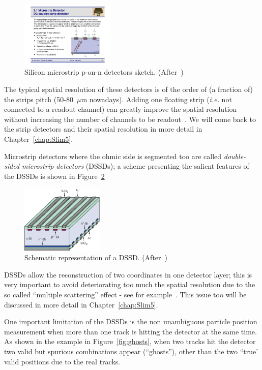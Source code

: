  \begin{figure}[htbp]
   \centering
   \includegraphics[width=0.4\textwidth]{Strips.pdf} 
      \caption{\label{fig:strips} Silicon microstrip p-on-n detectors sketch. (After~\cite{Krammer})}
\end{figure}
 
 The typical spatial resolution of these detectors is of the order of (a fraction of) the strips pitch 
 (50-80~$\mu$m nowadays).
 Adding one floating strip ({\it i.e.} not connected to a readout channel) can greatly 
 improve the spatial resolution without increasing the number of channels to be 
 readout~\cite{TURCHETTA}. We will come back to the strip detectors and their spatial resolution in 
 more detail in 
 Chapter~\ref{chap:Slim5}.
 
 Microstrip detectors where  the ohmic side is segmented too  are called {\it double-sided microstrip 
 detectors} (DSSDs); a scheme presenting the salient features of the DSSDs is shown in 
 Figure~\ref{fig:DSSD}
  \begin{figure}[htbp]
   \centering
   \includegraphics[width=0.35\textwidth]{DSSD.pdf} 
      \caption{\label{fig:DSSD} Schematic representation of a DSSD. (After~\cite{Krammer})}
\end{figure}

  DSSDs allow the reconstruction of two coordinates in one detector layer; 
 this is very important to avoid deteriorating too much the spatial resolution 
 due to the so called ``multiple scattering'' effect - see for example~\cite{pdg}. This issue too 
 will be discussed in more detail in Chapter~\ref{chap:Slim5}.

One important limitation of the DSSDs is the non unambiguous particle position measurement when 
more than one track is hitting the detector at the same time. As shown in the example 
in Figure~\ref{fig:ghosts}, when two tracks hit the detector two valid but spurious combinations 
appear (``ghosts''),  other than the two ``true' valid positions due to the real tracks.

